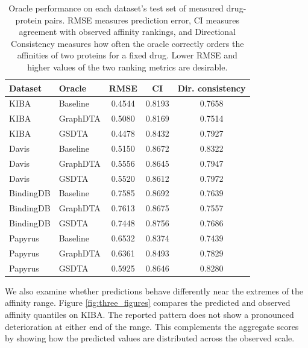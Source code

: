 \documentclass[a4paper,12pt]{article}
\begin{document}
\begin{table}[ht]
    \centering
    \caption[Oracle performance on held-out affinity measurements.]{Oracle performance on each dataset's test set of measured drug-protein pairs. RMSE measures prediction error, CI measures agreement with observed affinity rankings, and Directional Consistency measures how often the oracle correctly orders the affinities of two proteins for a fixed drug. Lower RMSE and higher values of the two ranking metrics are desirable.}
    \label{tab:oracle}
    \begin{tabular}{llccc}
        \toprule
        \textbf{Dataset} & \textbf{Oracle} & \textbf{RMSE} & \textbf{CI} & \textbf{Dir. consistency} \\
        \midrule
        KIBA & Baseline & 0.4544 & 0.8193 & 0.7658 \\
        KIBA & GraphDTA & 0.5080 & 0.8169 & 0.7514 \\
        KIBA & GSDTA & 0.4478 & 0.8432 & 0.7927 \\
        \midrule
        Davis & Baseline & 0.5150 & 0.8672 & 0.8322 \\
        Davis & GraphDTA & 0.5556 & 0.8645 & 0.7947 \\
        Davis & GSDTA & 0.5520 & 0.8612 & 0.7972 \\
        \midrule
        BindingDB & Baseline & 0.7585 & 0.8692 & 0.7639 \\
        BindingDB & GraphDTA & 0.7613 & 0.8675 & 0.7557 \\
        BindingDB & GSDTA & 0.7448 & 0.8756 & 0.7686 \\
        \midrule
        Papyrus & Baseline & 0.6532 & 0.8374 & 0.7439 \\
        Papyrus & GraphDTA & 0.6361 & 0.8493 & 0.7829 \\
        Papyrus & GSDTA & 0.5925 & 0.8646 & 0.8280 \\
        \bottomrule
    \end{tabular}
\end{table}

We also examine whether predictions behave differently near the extremes of the affinity range. Figure \ref{fig:three_figures} compares the predicted and observed affinity quantiles on KIBA. The reported pattern does not show a pronounced deterioration at either end of the range. This complements the aggregate scores by showing how the predicted values are distributed across the observed scale.
\end{document}
